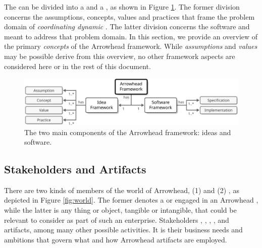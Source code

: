 %
%

The  can be divided into a  and a , as shown in Figure \ref{fig:framework}.
The former division concerns the assumptions, concepts, values and practices that frame the problem domain of \textit{coordinating dynamic }.
The latter division concerns the software  and  meant to address that problem domain.
In this section, we provide an overview of the primary \textit{concepts} of the Arrowhead framework.
While \textit{assumptions} and \textit{values} may be possible derive from this overview, no other framework aspects are considered here or in the rest of this document.

\vfill

\begin{figure}[ht!]
  \centering
  \includegraphics[scale=0.9]{figures/framework}
  \caption{
    The two main components of the Arrowhead framework: ideas and software.
  }
  \label{fig:framework}
\end{figure}

\vspace*{-3mm}

\subsection{Stakeholders and Artifacts}

There are two kinds of members of the world of Arrowhead, (1)  and (2) , as depicted in Figure \ref{fig:world}.
The former denotes a  or  engaged in an Arrowhead , while the latter is any thing or object, tangible or intangible, that could be relevant to consider as part of such an enterprise.
Stakeholders , , , , and  artifacts, among many other possible activities.
It is their business needs and ambitions that govern what and how Arrowhead artifacts are employed.

